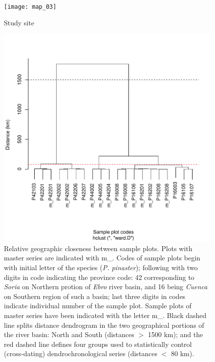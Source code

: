 \documentclass[review,authoryear]{elsarticle}
\begin{document}
\clearpage
\begin{figure}\centering
\texttt{[image: map\_03]} 
\caption{Study site}
\label{fig:map_03} 
\end{figure}

\clearpage
\begin{figure}\centering
\includegraphics[scale=0.8,trim=20mm 0mm 20mm 0mm]{clust} 
\caption{Relative geographic closeness between sample plots. Plots with
  master series are indicated with m\_. Codes of sample plots begin with
  initial letter of the species (\textit{P. pinaster}); following with
  two digits in code indicating the province code: 42 corresponding to
  \textit{Soria} on Northern protion of \textit{Ebro} river basin, and
  16 being \textit{Cuenca} on Southern region of such a basin; last
  three digits in codes indicate individual number of the sample
  plot. Sample plots of master series have been indicated with the
  letter m\_. Black dashed line splits distance dendrogram in the two
  geographical portions of the river basin: North and South (distances
  $>$ 1500 km); and the red dashed line defines four groups used to
  statistically control (cross-dating) dendrochronological series
  (distances $<$ 80 km).}
\label{fig:clust} 
\end{figure}
\end{document}
